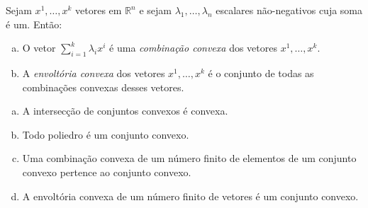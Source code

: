 \begin{mydef} \label{def:combinação_e_casco_convexo}
 Sejam $x^1, \ldots, x^k$ vetores em $\mathbb{R}^n$ e sejam $\lambda_1, \ldots, \lambda_n$ escalares não-negativos cuja soma é um. Então:
 \begin{enumerate}[(a)]
     \item O vetor $\sum^k_{i=1}\lambda_i x^i$ é uma \emph{combinação convexa} dos vetores $x^1, \ldots, x^k$.
     \item A \emph{envoltória convexa} dos vetores $x^1, \ldots, x^k$ é o conjunto de todas as combinações convexas desses vetores.
 \end{enumerate}
\end{mydef}

\begin{theorem} \label{teo:conjuntos_convexidade}
 \begin{enumerate}[(a)]
     \item \label{item:convexos_a} A intersecção de conjuntos convexos é convexa.
     \item Todo poliedro é um conjunto convexo.
     \item Uma combinação convexa de um número finito de elementos de um conjunto convexo pertence ao conjunto convexo.
     \item A envoltória convexa de um número finito de vetores é um conjunto convexo.
 \end{enumerate}
\end{theorem}

